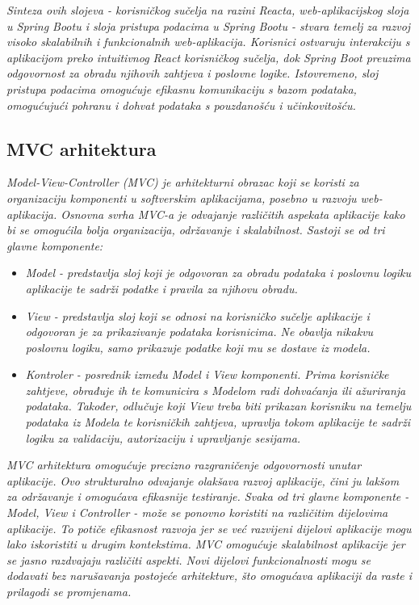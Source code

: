 \textit{Sinteza ovih slojeva - korisničkog sučelja na razini Reacta, web-aplikacijskog sloja u Spring Bootu i sloja pristupa podacima u Spring Bootu - stvara temelj za razvoj visoko skalabilnih i funkcionalnih web-aplikacija. Korisnici ostvaruju interakciju s aplikacijom preko intuitivnog React korisničkog sučelja, dok Spring Boot preuzima odgovornost za obradu njihovih zahtjeva i poslovne logike. Istovremeno, sloj pristupa podacima omogućuje efikasnu komunikaciju s bazom podataka, omogućujući pohranu i dohvat podataka s pouzdanošću i učinkovitošću.}

\subsection{MVC arhitektura}
\textit{Model-View-Controller (MVC) je arhitekturni obrazac koji se koristi za organizaciju komponenti u softverskim aplikacijama, posebno u razvoju web-aplikacija. Osnovna svrha MVC-a je odvajanje različitih aspekata aplikacije kako bi se omogućila bolja organizacija, održavanje i skalabilnost. Sastoji se od tri glavne komponente:}
\begin{itemize}
	\item\textit{Model - predstavlja sloj koji je odgovoran za obradu podataka i poslovnu logiku aplikacije te sadrži podatke i pravila za njihovu obradu.}
	\item\textit{View - predstavlja sloj koji se odnosi na korisničko sučelje aplikacije i odgovoran je za prikazivanje podataka korisnicima. Ne obavlja nikakvu poslovnu logiku, samo prikazuje podatke koji mu se dostave iz modela.}
	\item\textit{Kontroler - posrednik između Model i View komponenti. Prima korisničke zahtjeve, obrađuje ih te komunicira s Modelom radi dohvaćanja ili ažuriranja podataka. Također, odlučuje koji View treba biti prikazan korisniku na temelju podataka iz Modela te korisničkih zahtjeva, upravlja tokom aplikacije te sadrži logiku za validaciju, autorizaciju i upravljanje sesijama.}
\end{itemize}

\textit{MVC arhitektura omogućuje precizno razgraničenje odgovornosti unutar aplikacije. Ovo strukturalno odvajanje olakšava razvoj aplikacije, čini ju lakšom za održavanje i omogućava efikasnije testiranje. Svaka od tri glavne komponente - Model, View i Controller - može se ponovno koristiti na različitim dijelovima aplikacije. To potiče efikasnost razvoja jer se već razvijeni dijelovi aplikacije mogu lako iskoristiti u drugim kontekstima. MVC omogućuje skalabilnost aplikacije jer se jasno razdvajaju različiti aspekti. Novi dijelovi funkcionalnosti mogu se dodavati bez narušavanja postojeće arhitekture, što omogućava aplikaciji da raste i prilagodi se promjenama. }


